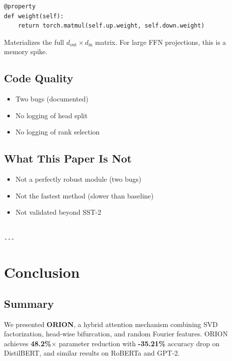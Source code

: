 \begin{lstlisting}
@property
def weight(self):
    return torch.matmul(self.up.weight, self.down.weight)
\end{lstlisting}

Materializes the full $d_\text{out} \times d_\text{in}$ matrix. For large 
FFN projections, this is a memory spike.

\subsection{Code Quality}

\begin{itemize}
\item Two bugs (documented)
\item No logging of head split
\item No logging of rank selection

\end{itemize}
\subsection{What This Paper Is Not}

\begin{itemize}
\item Not a perfectly robust module (two bugs)
\item Not the fastest method (slower than baseline)
\item Not validated beyond SST-2
\end{itemize}
\begin{lstlisting}

---
\end{lstlisting}


\section{Conclusion}

\subsection{Summary}

We presented \textbf{ORION}, a hybrid attention mechanism combining SVD 
factorization, head-wise bifurcation, and random Fourier features. ORION 
achieves \textbf{48.2\%$\times$} parameter reduction with \textbf{-35.21\%} accuracy 
drop on DistilBERT, and similar results on RoBERTa and GPT-2.

